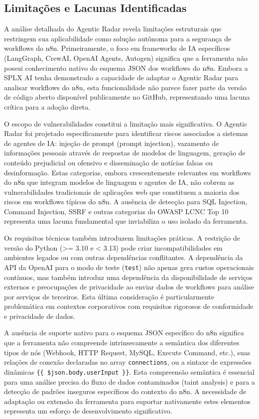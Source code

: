 \documentclass{sftex}
\begin{document}
\subsection{Limitações e Lacunas Identificadas}

A análise detalhada do Agentic Radar revela limitações estruturais que restringem sua aplicabilidade como solução autônoma para a segurança de workflows do n8n. Primeiramente, o foco em frameworks de IA específicos (LangGraph, CrewAI, OpenAI Agents, Autogen) significa que a ferramenta não possui conhecimento nativo do esquema JSON dos workflows do n8n. Embora a SPLX AI tenha demonstrado a capacidade de adaptar o Agentic Radar para analisar workflows do n8n, esta funcionalidade não parece fazer parte da versão de código aberto disponível publicamente no GitHub, representando uma lacuna crítica para a adoção direta.

O escopo de vulnerabilidades constitui a limitação mais significativa. O Agentic Radar foi projetado especificamente para identificar riscos associados a sistemas de agentes de IA: injeção de prompt (prompt injection), vazamento de informações pessoais através de respostas de modelos de linguagem, geração de conteúdo prejudicial ou ofensivo e disseminação de notícias falsas ou desinformação. Estas categorias, embora crescentemente relevantes em workflows do n8n que integram modelos de linguagem e agentes de IA, não cobrem as vulnerabilidades tradicionais de aplicações web que constituem a maioria dos riscos em workflows típicos do n8n. A ausência de detecção para SQL Injection, Command Injection, SSRF e outras categorias do OWASP LCNC Top 10 representa uma lacuna fundamental que inviabiliza o uso isolado da ferramenta.

Os requisitos técnicos também introduzem limitações práticas. A restrição de versão do Python (>= 3.10 e < 3.13) pode criar incompatibilidades em ambientes legados ou com outras dependências conflitantes. A dependência da API da OpenAI para o modo de teste (\texttt{test}) não apenas gera custos operacionais contínuos, mas também introduz uma dependência da disponibilidade de serviços externos e preocupações de privacidade ao enviar dados de workflows para análise por serviços de terceiros. Esta última consideração é particularmente problemática em contextos corporativos com requisitos rigorosos de conformidade e privacidade de dados.

A ausência de suporte nativo para o esquema JSON específico do n8n significa que a ferramenta não compreende intrinsecamente a semântica dos diferentes tipos de nós (Webhook, HTTP Request, MySQL, Execute Command, etc.), suas relações de conexão declaradas no array \texttt{connections}, ou a sintaxe de expressões dinâmicas \texttt{\{\{ \$json.body.userInput \}\}}. Esta compreensão semântica é essencial para uma análise precisa do fluxo de dados contaminados (taint analysis) e para a detecção de padrões inseguros específicos do contexto do n8n. A necessidade de adaptação ou extensão da ferramenta para suportar nativamente estes elementos representa um esforço de desenvolvimento significativo.
\end{document}
